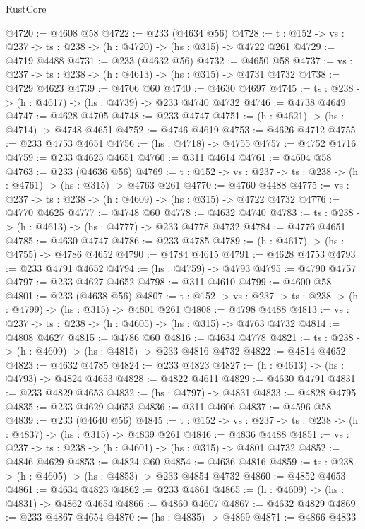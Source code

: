 \begin{lexlean}{RustCore}
\begin{coremodule}
@4720 := @4608 @58
@4722 := @233 (@4634 @56)
@4728 := {t : @152} -> {vs : @237} -> {ts : @238} -> (h : @4720) -> (hs : @315) -> @4722 @261
@4729 := @4719 @4488
@4731 := @233 (@4632 @56)
@4732 := @4650 @58
@4737 := {vs : @237} -> {ts : @238} -> (h : @4613) -> (hs : @315) -> @4731 @4732
@4738 := @4729 @4623
@4739 := @4706 @60
@4740 := @4630 @4697
@4745 := {ts : @238} -> (h : @4617) -> (hs : @4739) -> @233 @4740 @4732
@4746 := @4738 @4649
@4747 := @4628 @4705
@4748 := @233 @4747
@4751 := (h : @4621) -> (hs : @4714) -> @4748 @4651
@4752 := @4746 @4619
@4753 := @4626 @4712
@4755 := @233 @4753 @4651
@4756 := (hs : @4718) -> @4755
@4757 := @4752 @4716
@4759 := @233 @4625 @4651
@4760 := @311 @4614
@4761 := @4604 @58
@4763 := @233 (@4636 @56)
@4769 := {t : @152} -> {vs : @237} -> {ts : @238} -> (h : @4761) -> (hs : @315) -> @4763 @261
@4770 := @4760 @4488
@4775 := {vs : @237} -> {ts : @238} -> (h : @4609) -> (hs : @315) -> @4722 @4732
@4776 := @4770 @4625
@4777 := @4748 @60
@4778 := @4632 @4740
@4783 := {ts : @238} -> (h : @4613) -> (hs : @4777) -> @233 @4778 @4732
@4784 := @4776 @4651
@4785 := @4630 @4747
@4786 := @233 @4785
@4789 := (h : @4617) -> (hs : @4755) -> @4786 @4652
@4790 := @4784 @4615
@4791 := @4628 @4753
@4793 := @233 @4791 @4652
@4794 := (hs : @4759) -> @4793
@4795 := @4790 @4757
@4797 := @233 @4627 @4652
@4798 := @311 @4610
@4799 := @4600 @58
@4801 := @233 (@4638 @56)
@4807 := {t : @152} -> {vs : @237} -> {ts : @238} -> (h : @4799) -> (hs : @315) -> @4801 @261
@4808 := @4798 @4488
@4813 := {vs : @237} -> {ts : @238} -> (h : @4605) -> (hs : @315) -> @4763 @4732
@4814 := @4808 @4627
@4815 := @4786 @60
@4816 := @4634 @4778
@4821 := {ts : @238} -> (h : @4609) -> (hs : @4815) -> @233 @4816 @4732
@4822 := @4814 @4652
@4823 := @4632 @4785
@4824 := @233 @4823
@4827 := (h : @4613) -> (hs : @4793) -> @4824 @4653
@4828 := @4822 @4611
@4829 := @4630 @4791
@4831 := @233 @4829 @4653
@4832 := (hs : @4797) -> @4831
@4833 := @4828 @4795
@4835 := @233 @4629 @4653
@4836 := @311 @4606
@4837 := @4596 @58
@4839 := @233 (@4640 @56)
@4845 := {t : @152} -> {vs : @237} -> {ts : @238} -> (h : @4837) -> (hs : @315) -> @4839 @261
@4846 := @4836 @4488
@4851 := {vs : @237} -> {ts : @238} -> (h : @4601) -> (hs : @315) -> @4801 @4732
@4852 := @4846 @4629
@4853 := @4824 @60
@4854 := @4636 @4816
@4859 := {ts : @238} -> (h : @4605) -> (hs : @4853) -> @233 @4854 @4732
@4860 := @4852 @4653
@4861 := @4634 @4823
@4862 := @233 @4861
@4865 := (h : @4609) -> (hs : @4831) -> @4862 @4654
@4866 := @4860 @4607
@4867 := @4632 @4829
@4869 := @233 @4867 @4654
@4870 := (hs : @4835) -> @4869
@4871 := @4866 @4833

\end{coremodule}
\end{lexlean}

